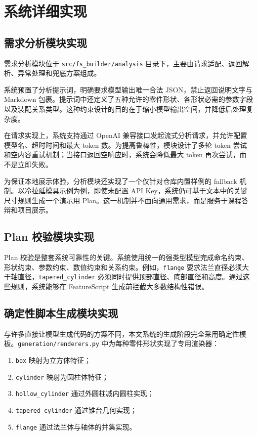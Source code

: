 \section{系统详细实现}

\subsection{需求分析模块实现}

需求分析模块位于 \texttt{src/fs\_builder/analysis} 目录下，主要由请求适配、返回解析、异常处理和兜底方案组成。

系统预置了分析提示词，明确要求模型输出唯一合法 JSON，禁止返回说明文字与 Markdown 包裹。提示词中还定义了五种允许的零件形状、各形状必需的参数字段以及装配关系类型。这种约束设计的目的在于缩小模型输出空间，并降低后处理复杂度。

在请求实现上，系统支持通过 OpenAI 兼容接口发起流式分析请求，并允许配置模型名、超时时间和最大 token 数。为提高鲁棒性，模块设计了多轮 token 尝试和空内容重试机制；当接口返回空响应时，系统会降低最大 token 再次尝试，而不是立即失败。

为保证本地展示体验，分析模块还实现了一个仅针对仓库内置样例的 fallback 机制。以冷拉延模具示例为例，即使未配置 API Key，系统仍可基于文本中的关键尺寸规则生成一个演示用 Plan。这一机制并不面向通用需求，而是服务于课程答辩和项目展示。

\subsection{Plan 校验模块实现}

Plan 校验是整套系统可靠性的关键。系统使用统一的强类型模型完成命名约束、形状约束、参数约束、数值约束和关系约束。例如，\texttt{flange} 要求法兰直径必须大于轴直径，\texttt{tapered\_cylinder} 必须同时提供顶部直径、底部直径和高度。通过这些规则，系统能够在 FeatureScript 生成前拦截大多数结构性错误。

\subsection{确定性脚本生成模块实现}

与许多直接让模型生成代码的方案不同，本文系统的生成阶段完全采用确定性模板。\texttt{generation/renderers.py} 中为每种零件形状实现了专用渲染器：
\begin{enumerate}[leftmargin=2em]
  \item \texttt{box} 映射为立方体特征；
  \item \texttt{cylinder} 映射为圆柱体特征；
  \item \texttt{hollow\_cylinder} 通过外圆柱减内圆柱实现；
  \item \texttt{tapered\_cylinder} 通过锥台几何实现；
  \item \texttt{flange} 通过法兰体与轴体的并集实现。
\end{enumerate}

